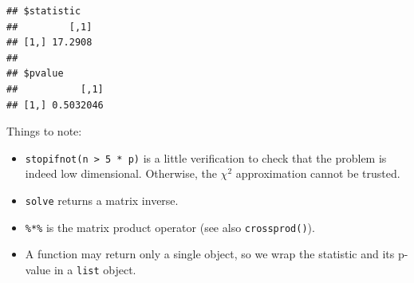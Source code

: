 \documentclass[]{book}
\newenvironment{Shaded}{\begin{snugshade}}{\end{snugshade}}
\newcommand{\ControlFlowTok}[1]{\textcolor[rgb]{0.13,0.29,0.53}{\textbf{#1}}}
\newcommand{\DataTypeTok}[1]{\textcolor[rgb]{0.13,0.29,0.53}{#1}}
\newcommand{\DecValTok}[1]{\textcolor[rgb]{0.00,0.00,0.81}{#1}}
\newcommand{\KeywordTok}[1]{\textcolor[rgb]{0.13,0.29,0.53}{\textbf{#1}}}
\newcommand{\NormalTok}[1]{#1}
\newcommand{\OperatorTok}[1]{\textcolor[rgb]{0.81,0.36,0.00}{\textbf{#1}}}
\newcommand{\OtherTok}[1]{\textcolor[rgb]{0.56,0.35,0.01}{#1}}
\newcommand{\StringTok}[1]{\textcolor[rgb]{0.31,0.60,0.02}{#1}}
\providecommand{\tightlist}{%
  \setlength{\itemsep}{0pt}\setlength{\parskip}{0pt}}
\theoremstyle{definition}
\theoremstyle{definition}
\theoremstyle{definition}
\theoremstyle{remark}
\begin{document}
\begin{Shaded}
\end{Shaded}

\begin{verbatim}
## $statistic
##         [,1]
## [1,] 17.2908
## 
## $pvalue
##           [,1]
## [1,] 0.5032046
\end{verbatim}

Things to note:

\begin{itemize}
\tightlist
\item
  \texttt{stopifnot(n\ \textgreater{}\ 5\ *\ p)} is a little verification to check that the problem is indeed low dimensional. Otherwise, the \(\chi^2\) approximation cannot be trusted.
\item
  \texttt{solve} returns a matrix inverse.
\item
  \texttt{\%*\%} is the matrix product operator (see also \texttt{crossprod()}).
\item
  A function may return only a single object, so we wrap the statistic and its p-value in a \texttt{list} object.
\end{itemize}
\end{document}
